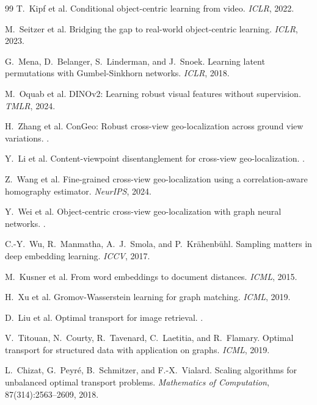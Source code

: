 \documentclass{article}
\begin{document}
{\begin{thebibliography}{99}
T.~Kipf et al.
\newblock Conditional object-centric learning from video.
\newblock \emph{ICLR}, 2022.

M.~Seitzer et al.
\newblock Bridging the gap to real-world object-centric learning.
\newblock \emph{ICLR}, 2023.

G.~Mena, D.~Belanger, S.~Linderman, and J.~Snoek.
\newblock Learning latent permutations with Gumbel-Sinkhorn networks.
\newblock \emph{ICLR}, 2018.

M.~Oquab et al.
\newblock DINOv2: Learning robust visual features without supervision.
\newblock \emph{TMLR}, 2024.

H.~Zhang et al.
\newblock ConGeo: Robust cross-view geo-localization across ground view variations.
.

Y.~Li et al.
\newblock Content-viewpoint disentanglement for cross-view geo-localization.
.

Z.~Wang et al.
\newblock Fine-grained cross-view geo-localization using a correlation-aware homography estimator.
\newblock \emph{NeurIPS}, 2024.

Y.~Wei et al.
\newblock Object-centric cross-view geo-localization with graph neural networks.
.

C.-Y.~Wu, R.~Manmatha, A.~J.~Smola, and P.~Kr\"ahenb\"uhl.
\newblock Sampling matters in deep embedding learning.
\newblock \emph{ICCV}, 2017.

M.~Kusner et al.
\newblock From word embeddings to document distances.
\newblock \emph{ICML}, 2015.

H.~Xu et al.
\newblock Gromov-Wasserstein learning for graph matching.
\newblock \emph{ICML}, 2019.

D.~Liu et al.
\newblock Optimal transport for image retrieval.
.

V.~Titouan, N.~Courty, R.~Tavenard, C.~Laetitia, and R.~Flamary.
\newblock Optimal transport for structured data with application on graphs.
\newblock \emph{ICML}, 2019.

L.~Chizat, G.~Peyr{\'e}, B.~Schmitzer, and F.-X.~Vialard.
\newblock Scaling algorithms for unbalanced optimal transport problems.
\newblock \emph{Mathematics of Computation}, 87(314):2563--2609, 2018.


\end{thebibliography}}
\end{document}
